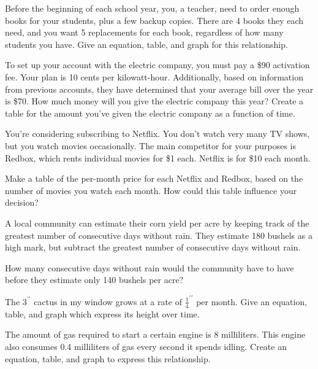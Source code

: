 \begin{exercise}
Before the beginning of each school year, you, a teacher, need to order enough books for your students, plus a few backup copies.  There are 4 books they each need, and you want 5 replacements for each book, regardless of how many students you have.  Give an equation, table, and graph for this relationship.
\end{exercise}
\bigskip

\begin{exercise}
To set up your account with the electric company, you must pay a \$90 activation fee.  Your plan is 10 cents per kilowatt-hour.  Additionally, based on information from previous accounts, they have determined that your average bill over the year is \$70.  How much money will you give the electric company this year?  Create a table for the amount you've given the electric company as a function of time.
\end{exercise}

\begin{exercise}
You're considering subscribing to Netflix.  You don't watch very many TV shows, but you watch movies occasionally.  The main competitor for your purposes is Redbox, which rents individual movies for \$1 each.  Netflix is for \$10 each month.

Make a table of the per-month price for each Netflix and Redbox, based on the number of movies you watch each month.  How could this table influence your decision?

\end{exercise}

\begin{exercise}
A local community can estimate their corn yield per acre by keeping track of the greatest number of consecutive days without rain.  They estimate 180 bushels as a high mark, but subtract the greatest number of consecutive days without rain.

How many consecutive days without rain would the community have to have before they estimate only 140 bushels per acre?
\end{exercise}
\bigskip

\begin{exercise}
	The $3^{\prime\prime}$ cactus in my window grows at a rate of $\frac{1}{4}^{\prime\prime}$ per month.  Give an equation, table, and graph which express its height over time.
\end{exercise}
\bigskip

\begin{exercise}

The amount of gas required to start a certain engine is 8 milliliters.  This engine also consumes 0.4 milliliters of gas every second it spends idling.  Create an equation, table, and graph to express this relationship.

\end{exercise}
\bigskip

